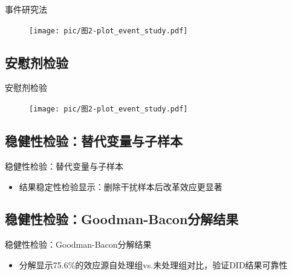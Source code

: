 \documentclass{beamer}
\newcommand{\tightlist}{%
  \setlength{\itemsep}{0pt}\setlength{\parskip}{0pt}}
\begin{document}
\begin{frame}{事件研究法}
\begin{figure}
    \centering
    \texttt{[image: pic/图2-plot\_event\_study.pdf]} 
    \caption{}
\end{figure}
\end{frame}

\subsection{安慰剂检验}\label{ux5b89ux6170ux5242ux68c0ux9a8c}

\begin{frame}{安慰剂检验}
\begin{figure}
    \centering
    \texttt{[image: pic/图2-plot\_event\_study.pdf]} 
    \caption{}
\end{figure}
\end{frame}

\subsection{稳健性检验：替代变量与子样本}\label{ux7a33ux5065ux6027ux68c0ux9a8cux66ffux4ee3ux53d8ux91cfux4e0eux5b50ux6837ux672c}

\begin{frame}{稳健性检验：替代变量与子样本}
\vspace{-2mm}
\begin{adjustbox}{width=0.95\textwidth,center} 

\end{adjustbox}

\begin{itemize}
\tightlist
\item
  结果稳定性检验显示：删除干扰样本后改革效应更显著
\end{itemize}
\end{frame}

\subsection{稳健性检验：Goodman-Bacon分解结果}\label{ux7a33ux5065ux6027ux68c0ux9a8cgoodman-baconux5206ux89e3ux7ed3ux679c}

\begin{frame}{稳健性检验：Goodman-Bacon分解结果}
\begin{adjustbox}{max totalheight=0.7\textheight} 

\end{adjustbox}

\vspace{-2mm}

\begin{itemize}
\tightlist
\item
  分解显示75.6\%的效应源自处理组vs.未处理组对比，验证DID结果可靠性
\end{itemize}
\end{frame}
\end{document}
